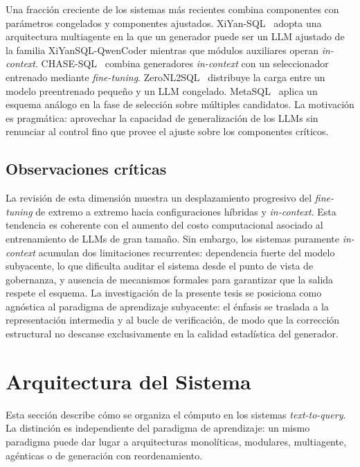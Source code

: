 Una fracción creciente de los sistemas más recientes combina componentes
con parámetros congelados y componentes ajustados.
XiYan-SQL~\cite{XiYan-SQL2024} adopta una arquitectura multiagente en la que
un generador puede ser un \ac{LLM} ajustado de la familia
XiYanSQL-QwenCoder mientras que módulos auxiliares operan
\emph{in-context}. CHASE-SQL~\cite{CHASE-SQL2025} combina generadores
\emph{in-context} con un seleccionador entrenado mediante \emph{fine-tuning}.
ZeroNL2SQL~\cite{ZeroNL2SQL2024} distribuye la carga entre un modelo
preentrenado pequeño y un \ac{LLM} congelado. MetaSQL~\cite{MetaSQL2024}
aplica un esquema análogo en la fase de selección sobre múltiples
candidatos. La motivación es pragmática: aprovechar la capacidad de
generalización de los \acp{LLM} sin renunciar al control fino que provee
el ajuste sobre los componentes críticos.

\subsection{Observaciones críticas}
\label{subsec:sota-d1-obs}

La revisión de esta dimensión muestra un desplazamiento progresivo del
\emph{fine-tuning} de extremo a extremo hacia configuraciones híbridas
y \emph{in-context}. Esta tendencia es coherente con el aumento del costo
computacional asociado al entrenamiento de \acp{LLM} de gran tamaño. Sin
embargo, los sistemas puramente \emph{in-context} acumulan dos
limitaciones recurrentes: dependencia fuerte del modelo subyacente, lo
que dificulta auditar el sistema desde el punto de vista de gobernanza, y
ausencia de mecanismos formales para garantizar que la salida respete
el esquema. La investigación de la presente tesis se posiciona como
agnóstica al paradigma de aprendizaje subyacente: el énfasis se traslada
a la representación intermedia y al bucle de verificación, de modo que
la corrección estructural no descanse exclusivamente en la calidad %
estadística del generador.

\section{Arquitectura del Sistema}
\label{sec:sota-d2-arquitectura}

Esta sección describe cómo se organiza el cómputo en los sistemas
\emph{text-to-query}. La distinción es independiente del paradigma de
aprendizaje: un mismo paradigma puede dar lugar a arquitecturas
monolíticas, modulares, multiagente, agénticas o de generación con
reordenamiento.

